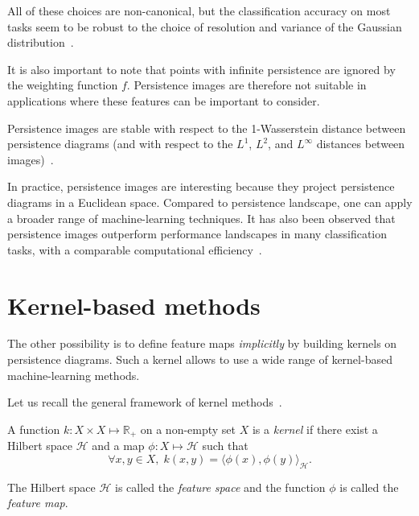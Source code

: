 \documentclass[a4paper,11pt,openany,extrafontsizes]{memoir}
\begin{document}
All of these choices are non-canonical, but the classification
accuracy on most tasks seem to be robust to the choice of resolution
and variance of the Gaussian
distribution~\cite{zeppelzauer_topological_2016}.

It is also important to note that points with infinite persistence are
ignored by the weighting function $f$. Persistence images are
therefore not suitable in applications where these features can be
important to consider.

Persistence images are stable with respect to the 1-Wasserstein
distance between persistence diagrams (and with respect to the $L^1$,
$L^2$, and $L^\infty$ distances between
images)~\cite{adams_persistence_2017}.

In practice, persistence images are interesting because they project
persistence diagrams in a Euclidean space. Compared to persistence
landscape, one can apply a broader range of machine-learning
techniques. It has also been observed that persistence images
outperform performance landscapes in many classification tasks, with a
comparable computational efficiency~\cite{adams_persistence_2017}.



\section{Kernel-based methods}%
\label{sec:kernel-based-methods}

The other possibility is to define feature maps \emph{implicitly} by
building kernels on persistence diagrams. Such a kernel allows to use
a wide range of kernel-based machine-learning methods.

Let us recall the general framework of kernel
methods~\cite{muandet_kernel_2017, sejdinovic_advanced_2018}.

\begin{defn}[kernel]
  A function $k:X\times X \mapsto \mathbb{R}_+$ on a non-empty set $X$
  is a \emph{kernel} if there exist a Hilbert space $\mathcal{H}$ and
  a map $\phi:X\mapsto\mathcal{H}$ such that
  \[ \forall x, y \in X,\; k(x,y) = {\langle \phi(x), \phi(y)
      \rangle}_{\mathcal{H}}. \]

  The Hilbert space $\mathcal{H}$ is called the \emph{feature space}
  and the function $\phi$ is called the \emph{feature map}.
\end{defn}
\end{document}
